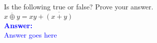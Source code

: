 \item{}
Is the following true or false? Prove your answer.\\[6pt]
$\overline{x\oplus y}=xy+\overline{(x+y)}$\\[12pt]
\ifanswers
\textcolor{blue}{
\textbf{Answer:}\\
Answer goes here
}
\newpage
\fi

